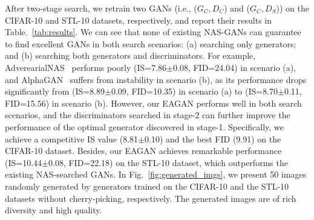 \documentclass[runningheads]{llncs}
\begin{document}
\begin{figure*}[!h]
    \centering
{}
    \caption{The searched discriminators on CIFAR-10 (top) and STL-10 (bottom).}
    \label{fig:searched_d}
\end{figure*}



After two-stage search, we retrain two GANs (i.e., ($G_C,D_C$) and ($G_C,D_S$)) on the CIFAR-10 and STL-10 datasets, respectively, and report their results in Table.~\ref{tab:results}. We can see that none of existing NAS-GANs can guarantee to find excellent GANs in both search scenarios: (a) searching only generators; and (b) searching both generators and discriminators. For example, AdverearialNAS~\cite{Adversarialnas} performs poorly (IS=7.86$\pm$0.08, FID=24.04) in scenario (a), and AlphaGAN~\cite{AlphaGAN} suffers from instability in scenario (b), as its performance drops significantly from (IS=8.89$\pm$0.09, FID=10.35) in scenario (a) to (IS=8.70$\pm$0.11, FID=15.56) in scenario (b). However, our EAGAN performs well in both search scenarios, and the discriminators searched in stage-2 can further improve the performance of the optimal generator discovered in stage-1. Specifically, we achieve a competitive IS value (8.81$\pm$0.10) and the best FID (9.91) on the CIFAR-10 dataset. Besides, our EAGAN achieves remarkable performance (IS=10.44$\pm$0.08, FID=22.18) on the STL-10 dataset, which outperforms the existing NAS-searched GANs. In Fig.~\ref{fig:generated_imgs}, we present 50 images randomly generated by generators trained on the CIFAR-10 and the STL-10 datasets without cherry-picking, respectively. The generated images are of rich diversity and high quality.




\begin{figure*}[h!]
    \centering
    \caption{The generated images by EAGAN in random without cherry-picking.}
    \label{fig:generated_imgs}
\end{figure*}
\end{document}
